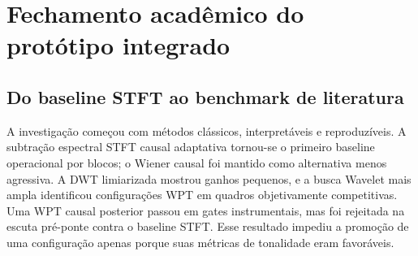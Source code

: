 %

\section{Fechamento acadêmico do protótipo integrado}

\subsection{Do baseline STFT ao benchmark de literatura}

A investigação começou com métodos clássicos, interpretáveis e reproduzíveis. A subtração espectral STFT causal adaptativa tornou-se o primeiro baseline operacional por blocos; o Wiener causal foi mantido como alternativa menos agressiva. A DWT limiarizada mostrou ganhos pequenos, e a busca Wavelet mais ampla identificou configurações WPT em quadros objetivamente competitivas. Uma WPT causal posterior passou em gates instrumentais, mas foi rejeitada na escuta pré-ponte contra o baseline STFT. Esse resultado impediu a promoção de uma configuração apenas porque suas métricas de tonalidade eram favoráveis.

